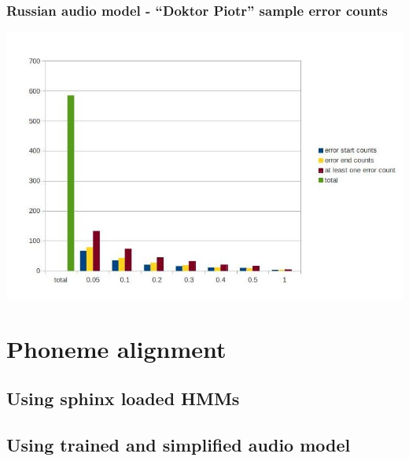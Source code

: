 \documentclass[]{beamer}
\begin{document}
\begin{frame}
    \frametitle{Russian audio model - “Doktor Piotr” sample error counts}
    \includegraphics[scale=0.37]{doktor_piotr_word_russian_results.jpg}
\end{frame}

\section{Phoneme alignment}
\begin{frame}
\end{frame}
\subsection{Using sphinx loaded HMMs}
\begin{frame}
\end{frame}
\subsection{Using trained and simplified audio model}
\begin{frame}
\end{frame}
\end{document}
